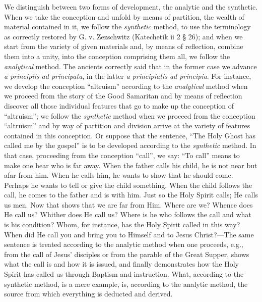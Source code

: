 We distinguish between two forms of development, the analytic and the synthetic. When we take the conception and unfold by means of partition, the wealth of material contained in it, we follow the \emph{synthetic} method, to use the terminology as correctly restored by G. v. Zezschwitz (Katechetik ii 2 § 26); and when we start from the variety of given materials and, by means of reflection, combine them into a unity, into the conception comprising them all, we follow the \emph{analytical} method. The ancients correctly said that in the former case we advance \emph{a principiis ad principata}, in the latter \emph{a principiatis ad principia}. For instance, we develop the conception “altruism” according to the \emph{analytical} method when we proceed from the story of the Good Samaritan and by means of reflection discover all those individual features that go to make up the conception of “altruism”; we follow the \emph{synthetic} method when we proceed from the conception “altruism” and by way of partition and division arrive at the variety of features contained in this conception. Or suppose that the sentence, “The Holy Ghost has called me by the gospel” is to be developed according to the \emph{synthetic} method. In that case, proceeding from the conception “call”, we say: “To call” means to make one hear who is far away. When the father calls his child, he is not near but afar from him. When he calls him, he wants to show that he should come. Perhaps he wants to tell or give the child something. When the child follows the call, he comes to the father and is with him. Just so the Holy Spirit calls; He calls us men. Now that shows that we are far from Him. Where are we? Whence does He call us? Whither does He call us? Where is he who follows the call and
what is his condition? Whom, for instance, has the Holy Spirit called in this way? When did He call you and bring you to Himself and to Jesus Christ?—The same sentence is treated according to the analytic method when one proceeds, e.g., from the call of Jesus’ disciples or from the parable of the Great Supper, shows what the call is and how it is issued, and finally demonstrates how the Holy Spirit has called us through Baptism and instruction. What, according to the synthetic method, is a mere example, is, according to the analytic method, the source from which everything is deducted and derived.

